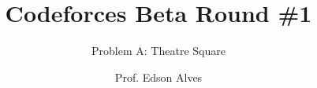 \title{Codeforces Beta Round \#1}
\subtitle{Problem A: Theatre Square}
\date{}
\author{Prof. Edson Alves}
